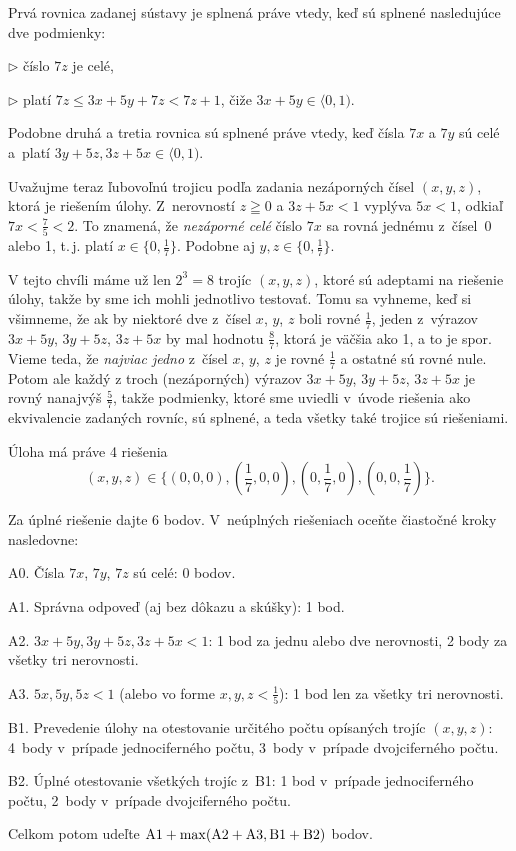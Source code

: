 {%
Prvá rovnica zadanej sústavy je splnená práve vtedy, keď sú
splnené nasledujúce dve podmienky:
\item{$\triangleright$} číslo $7z$ je celé,
\item{$\triangleright$} platí $7z\leq 3x+5y+7z< 7z+1$, čiže $3x+5y\in\langle0,1)$.

\noindent Podobne druhá a tretia rovnica sú splnené práve vtedy, keď čísla
$7x$ a $7y$ sú celé a~platí $3y+5z,3z+5x\in\langle0, 1)$.

Uvažujme teraz ľubovoľnú trojicu podľa zadania nezáporných čísel $(x,y,z)$,
ktorá je riešením úlohy. Z~nerovností $z\geqq0$ a $3z+5x<1$ vyplýva
$5x<1$, odkiaľ $7x<\frac75<2$. To znamená, že \emph{nezáporné celé}
číslo $7x$ sa rovná jednému z~čísel~0 alebo 1,
t.\,j. platí $x\in\{0,\frac17\}$. Podobne aj $y,z\in\{0,\frac17\}$.

V tejto chvíli máme už len $2^3=8$ trojíc $(x,y,z)$, ktoré sú
adeptami na riešenie úlohy, takže by sme ich mohli jednotlivo
testovať. Tomu sa vyhneme, keď si všimneme, že ak by
niektoré dve z~čísel $x$, $y$, $z$ boli rovné $\frac17$, jeden
z~výrazov $3x+5y$, $3y+5z$, $3z+5x$ by mal hodnotu $\frac87$,
ktorá je väčšia ako 1, a to je spor. Vieme teda, že {\it najviac jedno\/}
z~čísel $x$, $y$, $z$ je rovné $\frac17$ a ostatné sú rovné nule.
Potom ale každý z troch (nezáporných) výrazov $3x+5y$, $3y+5z$, $3z+5x$
je rovný nanajvýš $\frac57$, takže podmienky, ktoré sme uviedli
v~úvode riešenia ako ekvivalencie zadaných rovníc, sú splnené,
a teda všetky také trojice sú riešeniami.

\zaver
Úloha má práve 4 riešenia
$$\textstyle(x,y,z)\in \bigl\{(0,0,0), (\frac17,0,0), (0,\frac17,0), (0,0,\frac17 )\bigr\}.$$


\schemaABC
Za úplné riešenie dajte 6 bodov. V~neúplných riešeniach oceňte
čiastočné kroky nasledovne:
\item{A0.} Čísla $7x$, $7y$, $7z$ sú celé: 0 bodov.
\item{A1.} Správna odpoveď (aj bez dôkazu a skúšky): 1 bod.
\item{A2.} $3x+5y,3y+5z,3z+5x<1$: 1 bod za jednu alebo dve nerovnosti, 2 body za
všetky tri nerovnosti.
\item{A3.} $5x,5y,5z<1$ (alebo vo forme $x,y,z<\frac15$): 1 bod len za všetky
tri nerovnosti.
\item{B1.} Prevedenie úlohy na otestovanie určitého počtu opísaných trojíc
$(x,y,z)$: 4~body v~prípade jednociferného počtu, 3~body v~prípade
dvojciferného počtu.
\item{B2.} Úplné otestovanie všetkých trojíc z~B1: 1 bod v~prípade jednociferného počtu,
2~body v~prípade dvojciferného počtu.

\noindent
Celkom potom udeľte $\rm A1+\max(A2+A3,B1+B2)$ bodov.
\endschema

}


